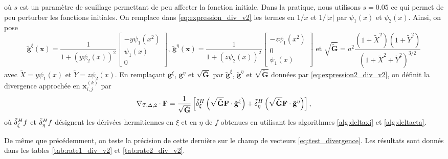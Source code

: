 où $s$ est un paramètre de seuillage permettant de peu affecter la fonction initiale. Dans la pratique, nous utilisons $s=0.05$ ce qui permet de peu perturber les fonctions initiales. On remplace dans \eqref{eq:expression_div_v2} les termes en $1/x$ et $1/|x|$ par $\psi_1(x)$ et $\psi_2(x)$. Ainsi, on pose
\begin{equation}
\tilde{\mathbf{g}}^{\xi} (\mathbf{x} ) = \dfrac{1}{1 + (y\psi_2(x))^2} \begin{bmatrix}
- y\psi_1(x^2) \\
\psi_1(x) \\
0
\end{bmatrix} \text{, }
\tilde{\mathbf{g}}^{\eta} (\mathbf{x} ) = \dfrac{1}{1 + (z\psi_2(x))^2} \begin{bmatrix}
- z\psi_1(x^2) \\
0 \\
\psi_1(x)
\end{bmatrix}
 \text{ et } \sqrt{\tilde{\mathbf{G}}} = a^2 \dfrac{(1+\tilde{X}^2)(1+ \tilde{Y}^2)}{(1+\tilde{X}^2+\tilde{Y}^2)^{3/2}}
\label{eq:expression2_div_v2}
\end{equation}
avec $\tilde{X}=y \psi_1(x)$ et $\tilde{Y} = z \psi_2(x)$.
En remplaçant $\mathbf{g}^{\xi}$, $\mathbf{g}^{\eta}$ et $\sqrt{\bar{\mathbf{G}}}$ par $\tilde{\mathbf{g}}^{\xi}$, $\tilde{\mathbf{g}}^{\eta}$ et $\sqrt{\tilde{\mathbf{G}}}$ données par \eqref{eq:expression2_div_v2}, on définit la divergence approchée en $\mathbf{x}_{i,j}^{(k)}$ par
\begin{equation}
\nabla_{T,\Delta,2} \cdot \mathbf{F} = \dfrac{1}{\sqrt{\tilde{\mathbf{G}}}} \left[ \tilde{\delta}^H_{\xi} \left( \sqrt{\tilde{\mathbf{G}}} \mathbf{F} \cdot \tilde{\mathbf{g}}^{\xi} \right) + 
\tilde{\delta}^H_{\eta} \left( \sqrt{\tilde{\mathbf{G}}} \mathbf{F} \cdot \tilde{\mathbf{g}}^{\eta} \right)
\right],
\label{eq:div_v2}
\end{equation}
où $\tilde{\delta}^H_{\xi} f$ et $\tilde{\delta}^H_{\eta} f$ désignent les dérivées hermitiennes en $\xi$ et en $\eta$ de $f$ obtenues en utilisant les algorithmes \ref{alg:deltaxi} et \ref{alg:deltaeta}. 

De même que précédemment, on teste la précision de cette dernière sur le champ de vecteurs \eqref{eq:test_divergence}. Les résultats sont donnés dans les tables \ref{tab:rate1_div_v2} et \ref{tab:rate2_div_v2}.

